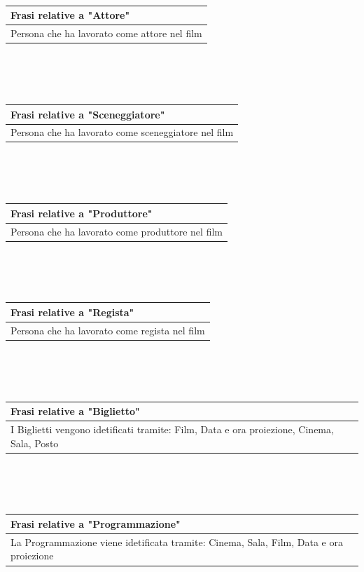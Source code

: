 \documentclass[10pt]{article}
\begin{document}
 	\\\\\\
 	\begin{tabular} { |p{16.8cm}| }
 		\hline
 		\rowcolor{lightgray}
 		\textbf{Frasi relative a "Attore"} \\
 		\hline
 		Persona che ha lavorato come attore nel film \\
 		\hline 		
 	\end{tabular} 
	\\\\\\
	\begin{tabular} { |p{16.8cm}| }
		\hline
		\rowcolor{lightgray}
		\textbf{Frasi relative a "Sceneggiatore"} \\
		\hline
		Persona che ha lavorato come sceneggiatore nel film \\
		\hline 		
	\end{tabular} 
	\\\\\\
	\begin{tabular} { |p{16.8cm}| }
		\hline
		\rowcolor{lightgray}
		\textbf{Frasi relative a "Produttore"} \\
		\hline
		Persona che ha lavorato come produttore nel film \\
		\hline 		
	\end{tabular} 
	\\\\\\
	\begin{tabular} { |p{16.8cm}| }
		\hline
		\rowcolor{lightgray}
		\textbf{Frasi relative a "Regista"} \\
		\hline
		Persona che ha lavorato come regista nel film \\
		\hline 		
	\end{tabular} 
	\\\\\\
	\begin{tabular} { |p{16.8cm}| }
		\hline
		\rowcolor{lightgray}
		\textbf{Frasi relative a "Biglietto"} \\
		\hline
		I Biglietti vengono idetificati tramite: Film, Data e ora proiezione, Cinema, Sala, Posto \\
		\hline 		
	\end{tabular} 
	\\\\\\
	\begin{tabular} { |p{16.8cm}| }
		\hline
		\rowcolor{lightgray}
		\textbf{Frasi relative a "Programmazione"} \\
		\hline
		La Programmazione viene idetificata tramite: Cinema, Sala, Film, Data e ora proiezione \\
		\hline 		
	\end{tabular} 
	
\end{document}
